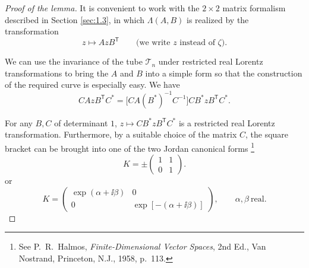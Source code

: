 \begin{proof}[Proof of the lemma]

It is convenient to work with the $2\times2$ matrix formalism described in
Section \ref{sec:1.3}, in which $\Lambda(A,B)$ is realized by the transformation
\begin{equation*}
  z\longmapsto AzB^{\mathsf T}
  \qquad\text{(we write $z$ instead of $\zeta$).}
\end{equation*}

We can use the invariance of the tube $\mathcal{T}_{n}$ under restricted real
Lorentz transformations to bring the $A$ and $B$ into a simple form so that the
construction of the required curve is especially easy.  We have
\begin{equation*}
  CAzB^{\mathsf T}C^*
  =\bigl[CA(B^*)^{-1}C^{-1}\bigr]CB^*zB^{\mathsf T}C^* .
\end{equation*}

For any $B,C$ of determinant $1$,
$z\longmapsto CB^*zB^{\mathsf T}C^*$ is a restricted real Lorentz
transformation.  Furthermore, by a suitable choice of the matrix $C$, the
square bracket can be brought into one of the two Jordan canonical forms
\begingroup
\renewcommand{\thefootnote}{\ensuremath{\dagger}}
\footnote{See P.~R.~Halmos, \emph{Finite-Dimensional Vector Spaces}, 2nd Ed.,
Van Nostrand, Princeton, N.J., 1958, p.~113.}
\endgroup
\begin{equation}
  K=\pm\begin{pmatrix}1&1\\[2pt]0&1\end{pmatrix} .
  \tag{2-87}\label{eq:ch2-jordan-unipotent}
\end{equation}
or
\begin{equation}
  K=\begin{pmatrix}
    \exp(\alpha+\ii\beta)&0\\[2pt]
    0&\exp[-(\alpha+\ii\beta)]
  \end{pmatrix},
  \qquad \alpha,\beta\ \text{real} .
  \tag{2-88}\label{eq:ch2-jordan-diagonal}
\end{equation}


\end{proof}
